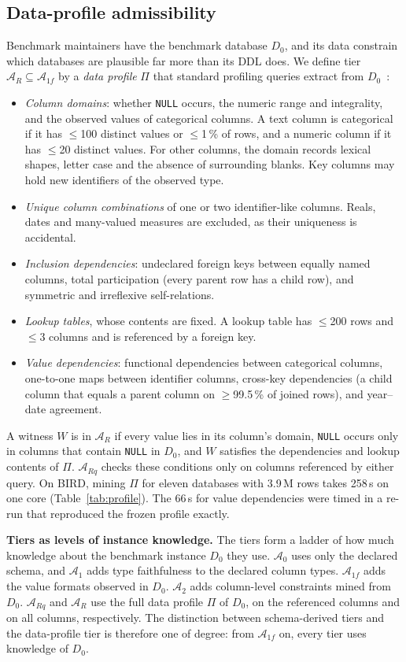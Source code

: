 \subsection{Data-profile admissibility}\label{sec:profile}
Benchmark maintainers have the benchmark database $D_0$, and its data constrain which databases are plausible far more than its DDL does. We define tier $\mathcal A_R\subseteq\mathcal A_{1f}$ by a \emph{data profile} $\Pi$ that standard profiling queries extract from $D_0$~\cite{abedjan2015profiling}:
\begin{itemize}
\item \emph{Column domains}: whether \texttt{NULL} occurs, the numeric range and integrality, and the observed values of categorical columns. A text column is categorical if it has $\le$100 distinct values or $\le$1\,\% of rows, and a numeric column if it has $\le$20 distinct values. For other columns, the domain records lexical shapes, letter case and the absence of surrounding blanks. Key columns may hold new identifiers of the observed type.
\item \emph{Unique column combinations} of one or two identifier-like columns. Reals, dates and many-valued measures are excluded, as their uniqueness is accidental.
\item \emph{Inclusion dependencies}: undeclared foreign keys between equally named columns, total participation (every parent row has a child row), and symmetric and irreflexive self-relations.
\item \emph{Lookup tables}, whose contents are fixed. A lookup table has $\le$200 rows and $\le$3 columns and is referenced by a foreign key.
\item \emph{Value dependencies}: functional dependencies between categorical columns, one-to-one maps between identifier columns, cross-key dependencies (a child column that equals a parent column on $\ge$99.5\,\% of joined rows), and year--date agreement.
\end{itemize}
A witness $W$ is in $\mathcal A_R$ if every value lies in its column's domain, \texttt{NULL} occurs only in columns that contain \texttt{NULL} in $D_0$, and $W$ satisfies the dependencies and lookup contents of $\Pi$. $\mathcal A_{Rq}$ checks these conditions only on columns referenced by either query. On BIRD, mining $\Pi$ for eleven databases with 3.9\,M rows takes 258\,s on one core (Table~\ref{tab:profile}). The 66\,s for value dependencies were timed in a re-run that reproduced the frozen profile exactly.

\textbf{Tiers as levels of instance knowledge.} The tiers form a ladder of how much knowledge about the benchmark instance $D_0$ they use. $\mathcal A_0$ uses only the declared schema, and $\mathcal A_1$ adds type faithfulness to the declared column types. $\mathcal A_{1f}$ adds the value formats observed in $D_0$. $\mathcal A_2$ adds column-level constraints mined from $D_0$. $\mathcal A_{Rq}$ and $\mathcal A_R$ use the full data profile $\Pi$ of $D_0$, on the referenced columns and on all columns, respectively. The distinction between schema-derived tiers and the data-profile tier is therefore one of degree: from $\mathcal A_{1f}$ on, every tier uses knowledge of $D_0$.

